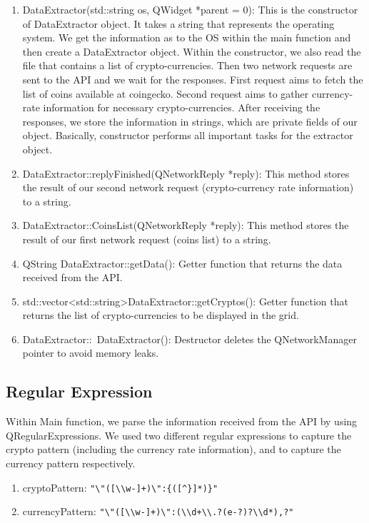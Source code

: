 \documentclass[12pt,a4paper]{article}
\begin{document}
\begin{enumerate}
    \item DataExtractor(std::string os, QWidget *parent = 0): This is the constructor of DataExtractor object. It takes a string that represents the operating system. We get the information as to the OS within the main function and then create a DataExtractor object. Within the constructor, we also read the file that contains a list of crypto-currencies. Then two network requests are sent to the API and we wait for the responses. First request aims to fetch the list of coins available at coingecko. Second  request aims to gather currency-rate information for necessary crypto-currencies. After receiving the responses, we store the information in strings, which are private fields of our object. Basically, constructor performs all important tasks for the extractor object. 
    \item DataExtractor::replyFinished(QNetworkReply *reply): This method stores the result of our second network request (crypto-currency rate information) to a string.
    \item DataExtractor::CoinsList(QNetworkReply *reply): This method stores the result of our first network request (coins list) to a string.
    \item QString DataExtractor::getData(): Getter function that returns the data received from the API.
    \item std::vector\textless std::string\textgreater DataExtractor::getCryptos(): Getter function that returns the list of crypto-currencies to be displayed in the grid.
    \item DataExtractor::~DataExtractor(): Destructor deletes the QNetworkManager pointer to avoid memory leaks. 
\end{enumerate}

\subsection{Regular Expression}

Within Main function, we parse the information received from the API by using QRegularExpressions. We used two different regular expressions to capture the crypto pattern (including the currency rate information), and to capture the currency pattern respectively. 
\begin{enumerate}
    \item cryptoPattern: \verb|"\"([\\w-]+)\":{([^}]*)}"|
    \item currencyPattern: \verb|"\"([\\w-]+)\":(\\d+\\.?(e-?)?\\d*),?"|
\end{enumerate}
\end{document}
